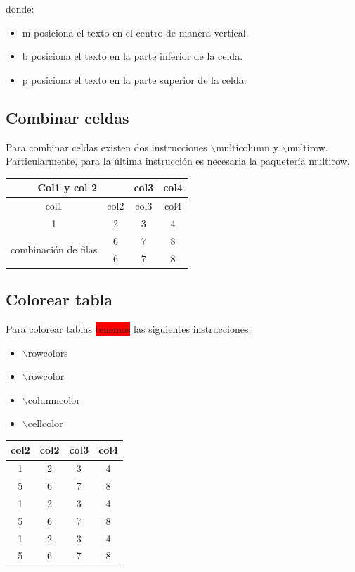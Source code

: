 \documentclass[]{article}
\begin{document}
donde: 
\begin{itemize}
	\item m posiciona el texto en el centro de manera vertical.
	\item b posiciona el texto en la parte inferior de la celda.
	\item p posiciona el texto en la parte superior de la celda.
\end{itemize}

\subsection{Combinar celdas}

Para combinar celdas existen dos instrucciones  $\backslash$multicolumn y $\backslash$multirow. Particularmente, para la última instrucción es necesaria la paquetería multirow.

\begin{tabular}[c]{|c|c|c|c|}%
	\hline 
	\multicolumn{2}{|c|}{Col1 y col 2} &col3 &col4\\
	\hline
	col1 & col2 & col3 & col4\\
	\hline
	1	&	2	&	3	&	4\\
	\hline
	\multirow{2}{3cm}{ combinación de filas} &	6	&	7	&	8\\ \cline{2-4}
		&	6	&	7	&	8\\
	\hline
\end{tabular}

\subsection{Colorear tabla}

Para colorear tablas  \colorbox{red}{tenemos} las siguientes instrucciones:

\begin{itemize}
	\item $\backslash$rowcolors
	\item  $\backslash$rowcolor
	\item $\backslash$columncolor
	\item  $\backslash$cellcolor
\end{itemize}

{
\begin{tabular}[c]{|cccc|}%
	\hline 
	col2 & col2 & col3 & col4\\ [1cm]
	\hline
	1	&	2	&	3	&	4\\
	5	&	6	&	7	&	8\\
	1	&	2	&	3	&	4\\
	5	&	6	&	7	&	8\\
	1	&	2	&	3	&	4\\
	5	&	6	&	7	&	8\\
	\hline
\end{tabular}
}
\end{document}
